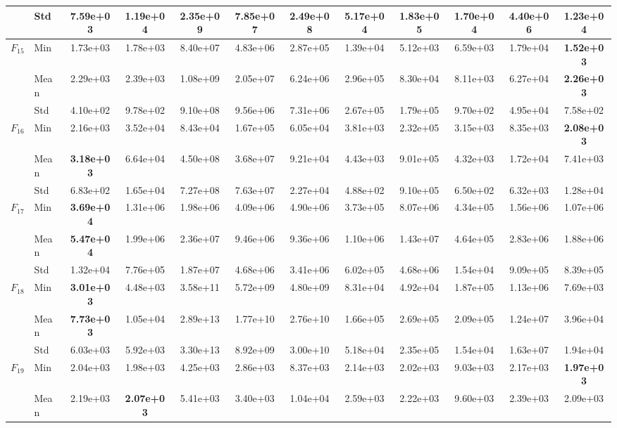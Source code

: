 \begin{center}
\begin{longtable}{clcccccccccc}
 & Std & 7.59e+03 & 1.19e+04 & 2.35e+09 & 7.85e+07 & 2.49e+08 & 5.17e+04 & 1.83e+05 & 1.70e+04 & 4.40e+06 & 1.23e+04 \\
\midrule
\multirow{3}{*}{$F_{15}$} & Min & 1.73e+03 & 1.78e+03 & 8.40e+07 & 4.83e+06 & 2.87e+05 & 1.39e+04 & 5.12e+03 & 6.59e+03 & 1.79e+04 & \textbf{1.52e+03} \\
 & Mean & 2.29e+03 & 2.39e+03 & 1.08e+09 & 2.05e+07 & 6.24e+06 & 2.96e+05 & 8.30e+04 & 8.11e+03 & 6.27e+04 & \textbf{2.26e+03} \\
 & Std & 4.10e+02 & 9.78e+02 & 9.10e+08 & 9.56e+06 & 7.31e+06 & 2.67e+05 & 1.79e+05 & 9.70e+02 & 4.95e+04 & 7.58e+02 \\
\midrule
\multirow{3}{*}{$F_{16}$} & Min & 2.16e+03 & 3.52e+04 & 8.43e+04 & 1.67e+05 & 6.05e+04 & 3.81e+03 & 2.32e+05 & 3.15e+03 & 8.35e+03 & \textbf{2.08e+03} \\
 & Mean & \textbf{3.18e+03} & 6.64e+04 & 4.50e+08 & 3.68e+07 & 9.21e+04 & 4.43e+03 & 9.01e+05 & 4.32e+03 & 1.72e+04 & 7.41e+03 \\
 & Std & 6.83e+02 & 1.65e+04 & 7.27e+08 & 7.63e+07 & 2.27e+04 & 4.88e+02 & 9.10e+05 & 6.50e+02 & 6.32e+03 & 1.28e+04 \\
\midrule
\multirow{3}{*}{$F_{17}$} & Min & \textbf{3.69e+04} & 1.31e+06 & 1.98e+06 & 4.09e+06 & 4.90e+06 & 3.73e+05 & 8.07e+06 & 4.34e+05 & 1.56e+06 & 1.07e+06 \\
 & Mean & \textbf{5.47e+04} & 1.99e+06 & 2.36e+07 & 9.46e+06 & 9.36e+06 & 1.10e+06 & 1.43e+07 & 4.64e+05 & 2.83e+06 & 1.88e+06 \\
 & Std & 1.32e+04 & 7.76e+05 & 1.87e+07 & 4.68e+06 & 3.41e+06 & 6.02e+05 & 4.68e+06 & 1.54e+04 & 9.09e+05 & 8.39e+05 \\
\midrule
\multirow{3}{*}{$F_{18}$} & Min & \textbf{3.01e+03} & 4.48e+03 & 3.58e+11 & 5.72e+09 & 4.80e+09 & 8.31e+04 & 4.92e+04 & 1.87e+05 & 1.13e+06 & 7.69e+03 \\
 & Mean & \textbf{7.73e+03} & 1.05e+04 & 2.89e+13 & 1.77e+10 & 2.76e+10 & 1.66e+05 & 2.69e+05 & 2.09e+05 & 1.24e+07 & 3.96e+04 \\
 & Std & 6.03e+03 & 5.92e+03 & 3.30e+13 & 8.92e+09 & 3.00e+10 & 5.18e+04 & 2.35e+05 & 1.54e+04 & 1.63e+07 & 1.94e+04 \\
\midrule
\multirow{3}{*}{$F_{19}$} & Min & 2.04e+03 & 1.98e+03 & 4.25e+03 & 2.86e+03 & 8.37e+03 & 2.14e+03 & 2.02e+03 & 9.03e+03 & 2.17e+03 & \textbf{1.97e+03} \\
 & Mean & 2.19e+03 & \textbf{2.07e+03} & 5.41e+03 & 3.40e+03 & 1.04e+04 & 2.59e+03 & 2.22e+03 & 9.60e+03 & 2.39e+03 & 2.09e+03 \\

\end{longtable}
\end{center}
